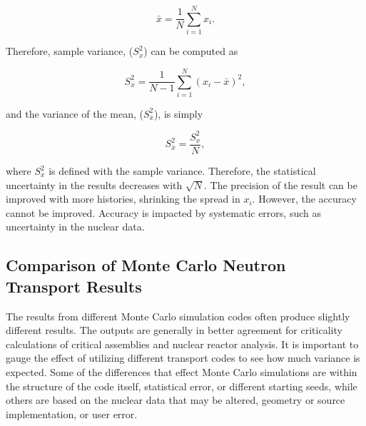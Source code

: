 \begin{equation} \label{eq:sampmean}
\bar{x} = \frac{1}{N}\sum_{i=1}^N x_i. 
\end{equation}

\noindent Therefore, sample variance, ($S_x^2$) can be computed as

\begin{equation} \label{eq:sampvar1}
S_x^2 = \frac{1}{N-1}\sum_{i=1}^N (x_i - \bar{x})^2,
\end{equation}

\noindent and the variance of the mean, ($S_{\bar{x}}^2$), is simply

\begin{equation} \label{eq:sampvar}
S_{\bar{x}}^2 = \frac{S_x^2}{N}, 
\end{equation}

\noindent where $S_x^2$ is defined with the sample variance.  
Therefore, the statistical uncertainty in the results decreases with $\sqrt{N}$. 
The precision of the result can be improved with more histories, shrinking the spread in $x_i$. 
However, the accuracy cannot be improved. 
Accuracy is impacted by systematic errors, such as uncertainty in the nuclear data.

\subsection{Comparison of Monte Carlo Neutron Transport Results}\label{'secMC'}

The results from different Monte Carlo simulation codes often produce slightly different results. The outputs are generally in better agreement for criticality calculations of critical assemblies and nuclear reactor analysis. 
It is important to gauge the effect of utilizing different transport codes to see how much variance is expected. 
Some of the differences that effect Monte Carlo simulations are within the structure of the code itself, statistical error, or different starting seeds, while others are based on the nuclear data that may be altered, geometry or source implementation, or user error.

